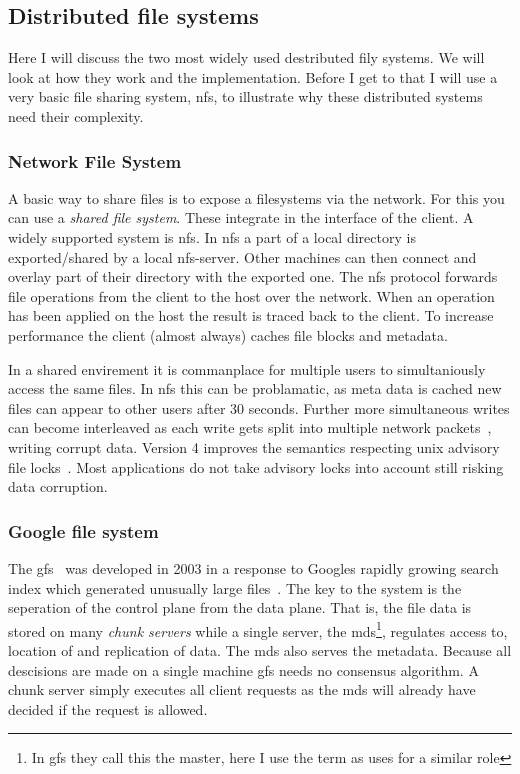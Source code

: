 \subsection{Distributed file systems}
Here I will discuss the two most widely used destributed fily systems. We will look at how they work and the implementation. Before I get to that I will use a very basic file sharing system, \ac{nfs}, to illustrate why these distributed systems need their complexity.

\subsubsection*{Network File System}
A basic way to share files is to expose a filesystems via the network. For this you can use a \textit{shared file system}. These integrate in the interface of the client. A widely supported system is \acf{nfs}. In \ac{nfs} a part of a local directory is exported/shared by a local \ac{nfs}-server. Other machines can then connect and overlay part of their directory with the exported one. The \ac{nfs} protocol forwards file operations from the client to the host over the network. When an operation has been applied on the host the result is traced back to the client. To increase performance the client (almost always) caches file blocks and metadata. 

In a shared envirement it is commanplace for multiple users to simultaniously access the same files. In \ac{nfs} this can be problamatic, as meta data is cached new files can appear to other users after 30 seconds. Further more simultaneous writes can become interleaved as each write gets split into multiple network packets~\cite[p. 527]{os}, writing corrupt data. Version 4 improves the semantics respecting unix advisory file locks~\cite{rfc3530}. Most applications do not take advisory locks into account still risking data corruption. 

\subsubsection*{Google file system}
The \ac{gfs}~\cite{GFS} was developed in 2003 in a response to Googles rapidly growing search index which generated unusually large files~\cite{GFS_interview}. The key to the system is the seperation of the control plane from the data plane. That is, the file data is stored on many \textit{chunk servers} while a single server, the \ac{mds}\footnote{In \ac{gfs} they call this the master, here I use the term as \ceph{} uses for a similar role}, regulates access to, location of and replication of data. The \ac{mds} also serves the metadata. Because all descisions are made on a single machine \ac{gfs} needs no consensus algorithm. A chunk server simply executes all client requests as the \ac{mds} will already have decided if the request is allowed. 

